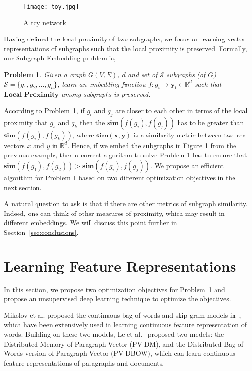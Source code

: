 \documentclass[sigconf]{acmart}
\newtheorem{problem}{Problem}
\newcommand{\s}{\mathcal{S}}
\begin{document}
\begin{figure}[htb]
	\texttt{[image: toy.jpg]}
	\caption{A toy network}
	\label{fig:toy}
\end{figure}

Having defined the local proximity of two subgraphs, we focus on learning vector representations of subgraphs such that the local proximity is preserved. Formally, our Subgraph Embedding problem is, 

\begin{problem} 
	\label{prob:embedding}
	Given a graph $G(V,E)$, $d$ and set of $\s$ subgraphs (of $G$) $\s = \{g_1,g_2, \dots, g_n \}$, learn an embedding function $f: g_i \rightarrow \mathbf{y_i} \in \mathbb{R}^d$ such that $\textbf{Local Proximity}$ among subgraphs is preserved.
\end{problem}

According to Problem~\ref{prob:embedding}, if $g_i$ and $g_j$ are closer to each other in terms of the local proximity that $g_k$ and $g_k$ then the $ \mathbf{sim} \left( f(g_i),f(g_j) \right)$ has to be greater than $ \mathbf{sim} \left( f(g_i),f(g_k) \right)$, where $\mathbf{sim}(\mathbf{x}, \mathbf{y})$ is a similarity metric between two real vectors $x$ and $y$ in $\mathbb{R}^d$. Hence, if we embed the subgraphs in Figure \ref{fig:toy} from the previous example, then a correct algorithm to solve Problem \ref{prob:embedding} has to ensure that $\mathbf{sim} \left( f(g_1),f(g_2) \right) > \mathbf{sim} \left( f(g_i),f(g_j) \right)$. We propose an efficient algorithm  for Problem \ref{prob:embedding} based on two different optimization objectives in the next section.

A natural question to ask is that if there are other metrics of subgraph similarity. Indeed, one can think of other measures of proximity, which may result in different embeddings. We will discuss this point further in Section~\ref{sec:conclusions}.


\section{Learning Feature Representations}
\label{sec:proposed}
In this section, we propose two optimization objectives for Problem~\ref{prob:embedding} and propose an unsupervised deep learning technique to optimize the objectives.
 
Mikolov et al. proposed the continuous bag of words and skip-gram models in~\cite{mikolov2013distributed}, which have been extensively used in learning continuous feature representation of words. Building on these two models, Le et al.~\cite{le2014distributed} proposed two models: the Distributed Memory of Paragraph Vector (PV-DM), and the Distributed Bag of Words version of Paragraph Vector (PV-DBOW), which can learn continuous feature representations of paragraphs and documents.
\end{document}
